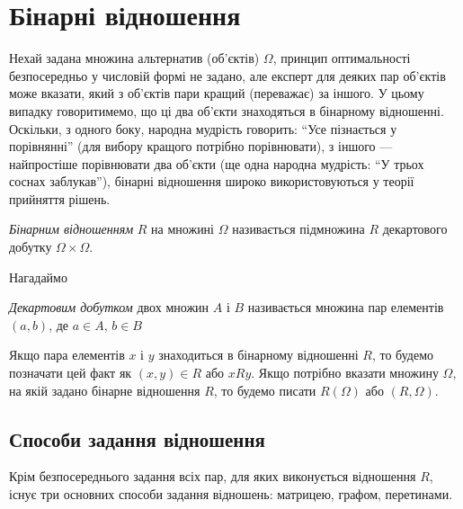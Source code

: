 






\setcounter{section}{1}

\tableofcontents

\section{Бінарні відношення} 

Нехай задана множина альтернатив (об'єктів) $\Omega$, принцип оптимальності безпосередньо у числовій формі не задано, але експерт для деяких пар об'єктів може вказати, який з об'єктів пари кращий (переважає) за іншого. У цьому випадку говоритимемо, що ці два об'єкти знаходяться в бінарному відношенні. Оскільки, з одного боку, народна мудрість говорить: ``Усе пізнається у порівнянні'' (для вибору кращого потрібно порівнювати), з іншого --- найпростіше порівнювати два об'єкти (ще одна народна мудрість: ``У трьох соснах заблукав''), бінарні відношення широко використовуються у теорії прийняття рішень.

\begin{definition}
	\textit{Бінарним відношенням} $R$ на множині $\Omega$ називається підмножина $R$ декартового добутку $\Omega \times \Omega$.
\end{definition}

Нагадаймо

\begin{definition}
	\textit{Декартовим добутком} двох множин $A$ і $B$ називається множина пар елементів $(a, b)$, де $a \in A$, $b \in B$
\end{definition}

Якщо пара елементів $x$ і $y$ знаходиться в бінарному відношенні $R$, то будемо позначати цей факт як $(x, y) \in R$ або $x R y$. Якщо потрібно вказати множину $\Omega$, на якій задано бінарне відношення $R$, то будемо писати $R(\Omega)$ або $(R, \Omega)$.

\subsection{Способи задання відношення}

Крім безпосереднього задання всіх пар, для яких виконується відношення $R$, існує три основних способи задання відношень: матрицею, графом, перетинами.

